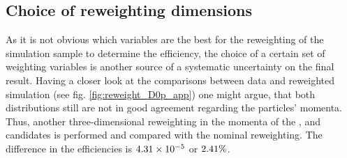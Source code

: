 \subsection{Choice of reweighting dimensions}
As it is not obvious which variables are the best for the reweighting of the \LbToDpmunuX simulation sample to determine the efficiency, the choice of a certain set of weighting variables is another source of a systematic uncertainty on the final result.
Having a closer look at the comparisons between data and reweighted simulation (see fig. \ref{fig:reweight_D0p_app}) one might argue, that both distributions still are not in good agreement regarding the particles' momenta.
Thus, another three-dimensional reweighting in the momenta of the \Dz\proton\mun, \Dz\mun and \Dz candidates is performed and compared with the nominal reweighting.
The difference in the efficiencies \effDp is $\num{4.31e-05}$ or $2.41\%$.

